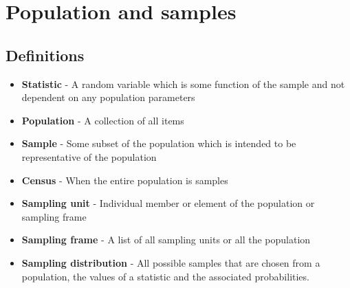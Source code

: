 \documentclass{article}[18pt]
\begin{document}
\section{Population and samples}
\subsection{Definitions}
\begin{itemize}
\item \textbf{Statistic} - A random variable which is some function of the sample and not dependent on any population parameters
\item \textbf{Population} - A collection of all items
\item \textbf{Sample} - Some subset of the population which is intended to be representative of the population
\item \textbf{Census} - When the entire population is samples
\item \textbf{Sampling unit} - Individual member or element of the population or sampling frame
\item \textbf{Sampling frame} - A list of all sampling units or all the population
\item \textbf{Sampling distribution} - All possible samples that are chosen from a population, the values of a statistic and the associated probabilities.
\end{itemize}
\end{document}
